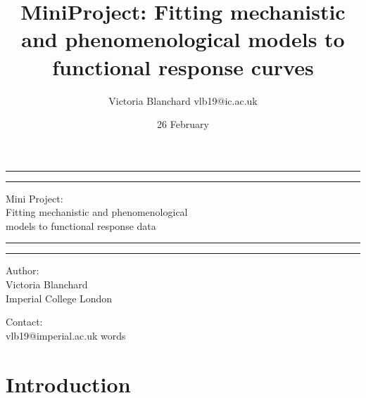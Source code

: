 \documentclass[11pt]{article}
\title {MiniProject: Fitting mechanistic and phenomenological models to functional response curves}
\author{Victoria Blanchard vlb19@ic.ac.uk}
\date{26 February}
\newcommand\wordcount{}
\begin{document}
	
	\begin{titlepage}
		
		
		\centering %
		
		
		
		
		\vspace*{5\baselineskip}
		
		\rule{\textwidth}{1.6pt}\vspace*{-\baselineskip}\vspace*{2pt} %
		\rule{\textwidth}{0.4pt} %
		
		\vspace{0.75\baselineskip} %
		
		{\LARGE Mini Project: \\ Fitting mechanistic and phenomenological \\ models to functional response data} 
		
		\vspace{0.75\baselineskip} %
		
		\rule{\textwidth}{0.4pt}\vspace*{-\baselineskip}\vspace{3.2pt} 
		\rule{\textwidth}{1.6pt} 
		
		\vspace{2\baselineskip} 
		
		
		Author: \\
		Victoria Blanchard \\
		Imperial College London
		
		\vspace{1.5 \baselineskip} %
		
		Contact: \\
		vlb19@imperial.ac.uk
		\mbox{}
		\vfill
		\wordcount words
		
	\end{titlepage}
	
	\linenumbers
	\doublespacing
	
	\section{Introduction}
	
\end{document}
